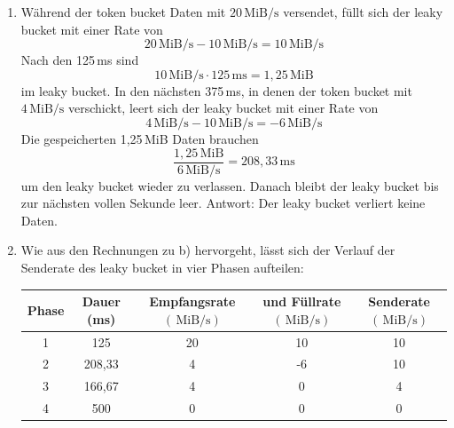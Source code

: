 \documentclass[a4paper,
			llpt,
			solution,
			accentcolor=tud2d,
			colorbacktitle
			]
			{tudexercise}
\newcommand{\MiBs}{\,\mathrm{MiB}/\mathrm{s}}
\begin{document}
\begin{enumerate}
\begin{multicols}{2}
\end{multicols}
\newpage
\item
Während der token bucket Daten mit $20\MiBs$ versendet, füllt sich der leaky bucket mit einer Rate von
$$
20 \MiBs - 10\MiBs = 10\MiBs
$$
Nach den 125\,ms sind
$$
10\MiBs  \cdot 125\mathrm{\,ms} = 1,25 \mathrm{\,MiB}
$$ im leaky bucket.
In den nächsten 375\,ms, in denen der token bucket mit $4\MiBs$ verschickt, leert sich der leaky bucket mit einer Rate von
$$
4\MiBs - 10\MiBs = -6 \MiBs
$$
Die gespeicherten 1,25\,MiB Daten brauchen
$$
\frac{1,25\mathrm{\,MiB}}{6\MiBs} = 208,33\mathrm{\,ms}
$$
um den leaky bucket wieder zu verlassen.
Danach bleibt der leaky bucket bis zur nächsten vollen Sekunde leer.\newline
Antwort: Der leaky bucket verliert keine Daten.
\item
Wie aus den Rechnungen zu b) hervorgeht, lässt sich der Verlauf der Senderate des leaky bucket in vier Phasen aufteilen:
\begin{center}
\begin{tabular}{|c|c|c|c|c|}
\hline
Phase
&
Dauer (ms)
&
Empfangsrate $\left( \MiBs \right)$
&
und Füllrate $\left( \MiBs \right)$
&
Senderate $\left( \MiBs \right)$
\\ \hline
1 & 125    & 20 & 10 & 10 \\ \hline
2 & 208,33 &  4 & -6 & 10 \\ \hline
3 & 166,67 &  4 &  0 &  4 \\ \hline
4 & 500    &  0 &  0 &  0 \\ \hline
\end{tabular}
\end{center}
\begin{center}
\end{center}
\end{enumerate}
\end{document}
